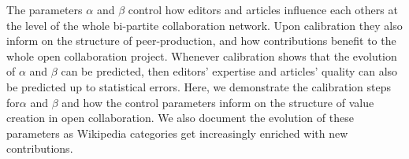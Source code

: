 The parameters $\alpha$ and $\beta$ control how editors and articles influence each others at the level of the whole bi-partite collaboration network. Upon calibration they also inform on the structure of peer-production, and how contributions benefit to the whole open collaboration project. Whenever calibration shows that the evolution of $\alpha$ and $\beta$ can be predicted, then editors' expertise and articles' quality can also be predicted up to statistical errors. Here, we demonstrate the calibration steps for$\alpha$ and $\beta$ and how the control parameters inform on the structure of value creation in open collaboration. We also document the evolution of these parameters as Wikipedia categories get increasingly enriched with new contributions.

%
%
%
%


